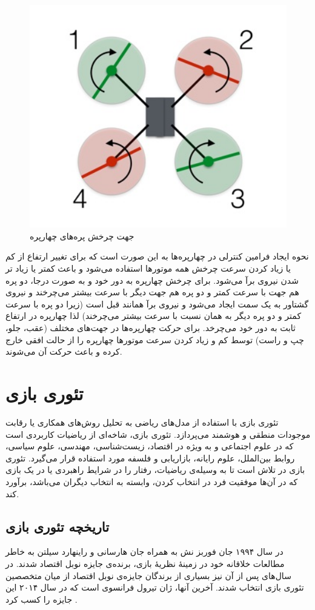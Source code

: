 \begin{figure}[H]
	\includegraphics[width=12cm]{../../Figures/introduction/Quadblade.jpg}
	\centering
	\caption{جهت چرخش پره‌های چهارپره
		\cite{Quadhowfly}}
\end{figure}

نحوه ایجاد فرامین کنترلی در چهارپره‌ها به این صورت است که برای تغییر ارتفاع از کم یا زیاد کردن سرعت چرخش همه موتورها استفاده می‌شود و باعث کمتر یا زیاد تر شدن نیروی برآ می‌شود. برای چرخش چهارپره به دور خود و به صورت درجا، دو پره هم جهت با سرعت کمتر و دو پره هم جهت دیگر با سرعت بیشتر می‌چرخند و نیروی گشتاور به یک سمت ایجاد می‌شود و نیروی برآ همانند قبل است (زیرا دو پره با سرعت کمتر و دو پره دیگر به همان نسبت با سرعت بیشتر می‌چرخند) لذا چهارپره در ارتفاع ثابت به دور خود می‌چرخد. برای حرکت چهارپره‌ها در جهت‌های مختلف (عقب، جلو، چپ و راست) توسط کم و زیاد کردن سرعت موتورها چهارپره را از حالت افقی خارج کرده و باعث حرکت آن می‌شوند.


\section{تئوری بازی}
تئوری بازی با استفاده از مدل‌های ریاضی به تحلیل روش‌های همکاری یا رقابت موجودات منطقی و هوشمند می‌پردازد. تئوری بازی، شاخه‌ای از ریاضیات کاربردی است که در علوم اجتماعی و به ویژه در اقتصاد، زیست‌شناسی، مهندسی، علوم سیاسی، روابط بین‌الملل، علوم رایانه، بازاریابی و فلسفه مورد استفاده قرار می‌گیرد. تئوری بازی در تلاش است تا به وسیله‌ی ریاضیات، رفتار را در شرایط راهبردی یا در یک بازی که در آن‌ها موفقیت فرد در انتخاب کردن، وابسته به انتخاب دیگران می‌باشد، برآورد کند.
\subsection{تاریخچه تئوری بازی}
در سال ۱۹۹۴ جان فوربز نش به همراه جان هارسانی و راینهارد سیلتن به خاطر مطالعات خلاقانه خود در زمینهٔ نظریهٔ بازی، برنده‌ی جایزه نوبل اقتصاد شدند. در سال‌های پس از آن نیز بسیاری از برندگان جایزه‌ی نوبل اقتصاد از میان متخصصین تئوری بازی انتخاب شدند. آخرین آنها، ژان تیرول فرانسوی است که در سال ۲۰۱۴ این جایزه را کسب کرد \cite{nobel}.
